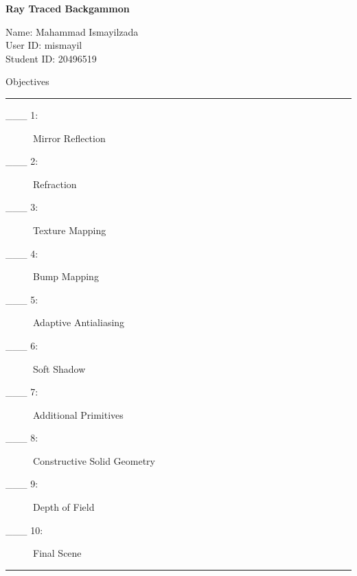 \documentclass{article}
\newcommand\projecttitle{Ray Traced Backgammon}
\newcommand\myname{Mahammad Ismayilzada}
\newcommand\myuserid{mismayil}
\newcommand\mystudentid{20496519}
\begin{document}
\newpage

{\huge \bf
	\projecttitle
}

\medskip
Name: \myname \\
User ID: \myuserid \\
Student ID: \mystudentid

\bigskip
{\Large Objectives}

\hrule
\begin{description}
        \item[\_\_\_ 1:]
        Mirror Reflection

        \item[\_\_\_ 2:]
		Refraction

        \item[\_\_\_ 3:]
		Texture Mapping

        \item[\_\_\_ 4:]
		Bump Mapping

        \item[\_\_\_ 5:]
		Adaptive Antialiasing

        \item[\_\_\_ 6:]
		Soft Shadow

        \item[\_\_\_ 7:]
		Additional Primitives

        \item[\_\_\_ 8:]
		Constructive Solid Geometry

        \item[\_\_\_ 9:]
		Depth of Field

        \item[\_\_\_ 10:]
		Final Scene

\end{description}

\hrule
\end{document}
